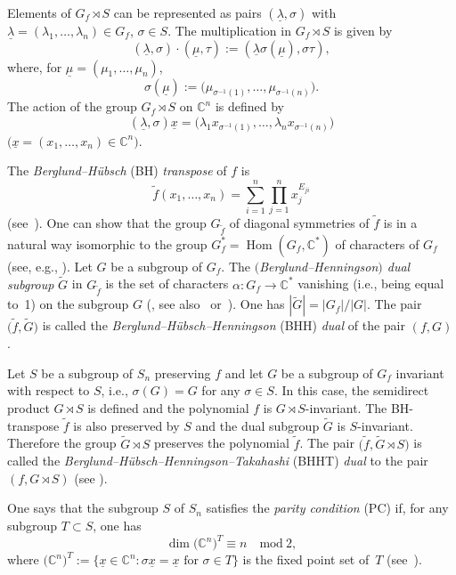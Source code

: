\documentclass[11pt]{article}
\numberwithin{equation}{section}
\numberwithin{equation}{section}
\begin{document}
\begin{Remark}Elements of $G_f \rtimes S$ can be represented as pairs $(\underline{\lambda}, \sigma)$ with
$\underline{\lambda}=(\lambda_1, \dots , \lambda_n) \in G_f$, $\sigma \in S$. The multiplication in
$G_f \rtimes S$ is given by
\[
(\underline{\lambda}, \sigma) \cdot (\underline{\mu}, \tau) :=
(\underline{\lambda} \sigma(\underline{\mu}), \sigma \tau) ,
\]
where, for $\underline{\mu}=(\mu_1, \dots , \mu_n)$,
\[
\sigma(\underline{\mu}):= \big(\mu_{\sigma^{-1}(1)}, \dots , \mu_{\sigma^{-1}(n)}\big) .
\]
The action of the group $G_f \rtimes S$ on ${\mathbb C}^n$ is defined by
\[
(\underline{\lambda}, \sigma)\underline{x} = \big(\lambda_1x_{\sigma^{-1}(1)}, \dots , \lambda_nx_{\sigma^{-1}(n)}\big)
\]
$\big(\underline{x}=(x_1, \dots , x_n) \in {\mathbb C}^n\big)$.
\end{Remark}

The {\em Berglund--H\"ubsch} (BH) {\em transpose} of $f$ is
\[
\widetilde{f}(x_1, \dots, x_n)=\sum_{i=1}^n \prod_{j=1}^n x_j^{E_{ji}}
\]
(see~\cite{BH1}). One can show that the group $G_{\widetilde{f}}$ of diagonal symmetries of $\widetilde{f}$ is in a natural way isomorphic
to the group $G_f^*=\operatorname{Hom}(G_f,{\mathbb C}^*)$ of characters of $G_f$ (see, e.g., \cite[Proposition~2]{EG-BLMS}). Let $G$ be a subgroup of $G_f$. The {\em $($Berglund--Henningson$)$ dual subgroup} $\widetilde{G}$ in $G_{\widetilde{f}}$ is the set of characters $\alpha\colon G_f \to {\mathbb C}^*$ vanishing (i.e., being equal to~1) on the subgroup $G$ (\cite{BH2}, see also~\cite{Krawitz-thesis} or~\cite{Krawitz}). One has $|\widetilde{G}|=|G_f|/|G|$. The pair $\big(\widetilde{f},\widetilde{G}\big)$ is called the {\em Berglund--H\"ubsch--Henningson} (BHH) {\em dual}
of the pair $(f,G)$.

Let $S$ be a subgroup of $S_n$ preserving $f$ and let $G$ be a subgroup of $G_f$ invariant with respect to $S$, i.e., $\sigma(G)=G$ for any $\sigma \in S$. In this case, the semidirect product $G \rtimes S$ is defined and the polynomial $f$ is $G \rtimes S$-invariant. The BH-transpose $\widetilde{f}$ is also preserved by $S$ and the dual subgroup $\widetilde{G}$ is $S$-invariant. Therefore the group $\widetilde{G} \rtimes S$ preserves the polynomial $\widetilde{f}$. The pair $\big(\widetilde{f},\widetilde{G}\rtimes S\big)$ is called the {\em Berglund--H\"ubsch--Henningson--Takahashi} (BHHT) {\em dual} to the pair $(f,G\rtimes S)$ (see \cite{EG-IMRN}).

One says that the subgroup $S$ of $S_n$ satisfies the {\em parity condition} (PC) if, for any subgroup
$T \subset S$, one has
\[
\dim\big({\mathbb C}^n\big)^T \equiv n \quad \mbox{mod}\ 2,
\]
where $\big({\mathbb C}^n\big)^T:= \big\{ \underline{x} \in {\mathbb C}^n \colon \sigma \underline{x} =
\underline{x} \mbox{ for } \sigma \in T \big\}$ is the fixed point set of~$T$ (see~\cite{EG-IMRN}).
\end{document}
